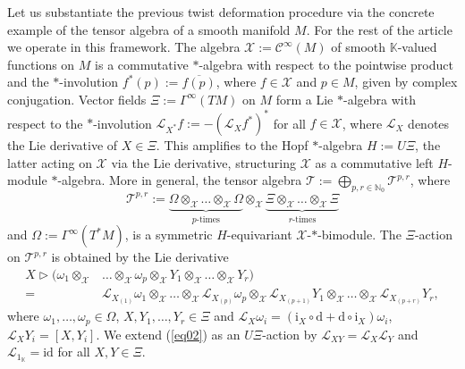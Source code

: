 \documentclass[a4paper,11pt]{article}
\begin{document}
Let us substantiate the previous twist deformation procedure via the concrete example
of the tensor algebra of a smooth manifold $M$. For the rest of the article we operate
in this framework. The algebra $\mathcal{X}:=\mathcal{C}^\infty(M)$ of smooth
$\mathbb{K}$-valued functions on $M$ is a commutative $*$-algebra with respect to
the pointwise product and the $*$-involution $f^*(p):=\overline{f(p)}$, 
where $f\in\mathcal{X}$ and $p\in M$, given by complex conjugation. Vector fields
$\Xi:=\Gamma^\infty(TM)$ on $M$ form a Lie $*$-algebra with respect to the
$*$-involution $\mathcal{L}_{X^*}f:=-(\mathcal{L}_Xf^*)^*$ for all 
$f\in\mathcal{X}$, where $\mathcal{L}_X$ denotes the Lie derivative of $X\in\Xi$.
This amplifies to the Hopf $*$-algebra $H:=U\Xi$, the latter acting on $\mathcal{X}$
via the Lie derivative, structuring $\mathcal{X}$
as a commutative left $H$-module $*$-algebra. More in general, the tensor algebra
$\mathcal{T}:=\bigoplus_{p,r\in\mathbb{N}_0}\mathcal{T}^{p,r}$, where
\begin{equation}
    \mathcal{T}^{p,r}:=
    \underbrace{\Omega\otimes_\mathcal{X}\ldots\otimes_\mathcal{X}\Omega}_{p\text{-times}}
    \otimes_\mathcal{X}
    \underbrace{\Xi\otimes_\mathcal{X}\ldots\otimes_\mathcal{X}\Xi}_{r\text{-times}}
\end{equation}
and $\Omega:=\Gamma^\infty(T^*M)$, is a symmetric $H$-equivariant 
$\mathcal{X}$-$*$-bimodule. The $\Xi$-action on $\mathcal{T}^{p,r}$ is obtained
by the Lie derivative
\begin{equation}\label{eq02}
\begin{split}
    X\rhd(\omega_1\otimes_\mathcal{X}&\ldots\otimes_\mathcal{X}\omega_p
    \otimes_\mathcal{X}Y_1\otimes_\mathcal{X}\ldots\otimes_\mathcal{X}Y_r)\\
    =&\mathcal{L}_{X_{(1)}}\omega_1\otimes_\mathcal{X}
    \ldots\otimes_\mathcal{X}\mathcal{L}_{X_{(p)}}\omega_p
    \otimes_\mathcal{X}\mathcal{L}_{X_{(p+1)}}Y_1\otimes_\mathcal{X}
    \ldots\otimes_\mathcal{X}\mathcal{L}_{X_{(p+r)}}Y_r,
\end{split}
\end{equation}
where $\omega_1,\ldots,\omega_p\in\Omega$, $X,Y_1,\ldots,Y_r\in\Xi$ and
$\mathcal{L}_X\omega_i=(\mathrm{i}_X\circ\mathrm{d}+\mathrm{d}\circ\mathrm{i}_X)\omega_i$,
$\mathcal{L}_XY_i=[X,Y_i]$. We extend (\ref{eq02}) as an $U\Xi$-action by
$\mathcal{L}_{XY}=\mathcal{L}_X\mathcal{L}_Y$ and $\mathcal{L}_{1_\mathbb{K}}=\mathrm{id}$
for all $X,Y\in\Xi$.
\end{document}
